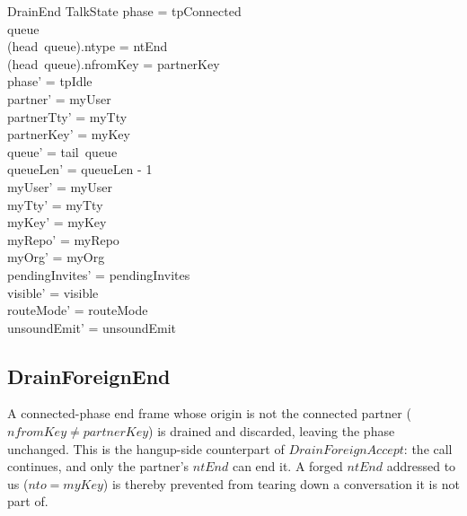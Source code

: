 \documentclass[a4paper,10pt,fleqn]{article}
\begin{document}
\begin{schema}{DrainEnd}
  \Delta TalkState
\where
  phase = tpConnected \\
  queue \neq \langle \rangle \\
  (head~queue).ntype = ntEnd \\
  (head~queue).nfromKey = partnerKey \\
  phase' = tpIdle \\
  partner' = myUser \\
  partnerTty' = myTty \\
  partnerKey' = myKey \\
  queue' = tail~queue \\
  queueLen' = queueLen - 1 \\
  myUser' = myUser \\
  myTty' = myTty \\
  myKey' = myKey \\
  myRepo' = myRepo \\
  myOrg' = myOrg \\
  pendingInvites' = pendingInvites \\
  visible' = visible \\
  routeMode' = routeMode \\
  unsoundEmit' = unsoundEmit
\end{schema}

\subsection{DrainForeignEnd}

A connected-phase end frame whose origin is not the connected partner
($nfromKey \neq partnerKey$) is drained and discarded, leaving the
phase unchanged.  This is the hangup-side counterpart of
$DrainForeignAccept$: the call continues, and only the partner's
$ntEnd$ can end it.  A forged $ntEnd$ addressed to us ($nto = myKey$)
is thereby prevented from tearing down a conversation it is not part
of.
\end{document}
